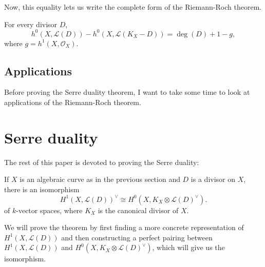 \documentclass[12pt]{article}
\begin{document}
Now, this equality lets us write the complete form of the Riemann-Roch
theorem.
\begin{thm}\label{thm:riemann_roch}
  For every divisor $D$,
  \[
    h^{0}(X, \mathcal{L}(D))-h^{0}(X, \mathcal{L}(K_{X}-D))=\deg(D)+1-g,
  \]
  where $g=h^{1}(X, \mathcal{O}_{X})$.
\end{thm}

\subsection{Applications}
Before proving the Serre duality theorem, I want to take some time to
look at applications of the Riemann-Roch theorem.

\section{Serre duality}
The rest of this paper is devoted to proving the Serre duality:
\begin{thm}
  If $X$ is an algebraic curve as in the previous section
  and $D$ is a divisor on $X$, there is an isomorphism
  \[
    H^{1}(X, \mathcal{L}(D))^{\vee}\cong H^{0}(X, K_{X}
    \otimes \mathcal{L}(D)^{\vee}).
  \]
  of $k$-vector spaces, where $K_{X}$ is the canonical divisor of $X$.
\end{thm}
We will prove the theorem by first finding a more concrete representation of
$H^{1}(X,\mathcal{L}(D))$ and then constructing a perfect pairing between
$H^{1}(X,\mathcal{L}(D))$ and $H^{0}(X,K_{X}\otimes\mathcal{L}(D)^{\vee})$,
which will give us the isomorphism.
\end{document}
